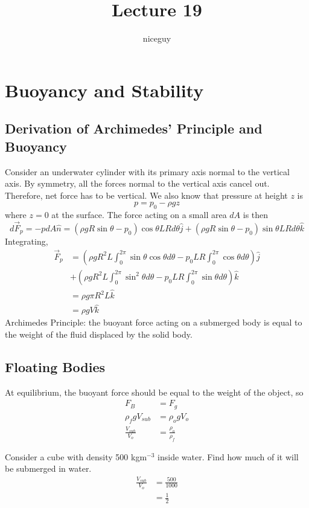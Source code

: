 \documentclass[12pt]{article}
\author{niceguy}
\title{Lecture 19}
\begin{document}
\maketitle

\section{Buoyancy and Stability}

\subsection{Derivation of Archimedes' Principle and Buoyancy}
Consider an underwater cylinder with its primary axis normal to the vertical axis. By symmetry, all the forces normal to the vertical axis cancel out. Therefore, net force has to be vertical. We also know that pressure at height $z$ is
$$p = p_0 - \rho gz$$
where $z=0$ at the surface. The force acting on a small area $dA$ is then
$$d\vec{F}_p = -pdA\hat{n} = (\rho gR\sin\theta-p_0)\cos\theta LRd\theta\hat{j} + (\rho gR\sin\theta-p_0)\sin\theta LRd\theta\hat{k}$$
Integrating,
\begin{align*}
	\vec{F}_p &= \left(\rho gR^2L\int_0^{2\pi}\sin\theta\cos\theta d\theta - p_0LR\int_0^{2\pi}\cos\theta d\theta\right)\hat{j} \\
		  &+ \left(\rho gR^2L\int_0^{2\pi}\sin^2\theta d\theta - p_0LR\int_0^{2\pi}\sin\theta d\theta\right)\hat{k} \\
		  &= \rho g\pi R^2L\hat{k} \\
		  &= \rho gV\hat{k}
\end{align*}
Archimedes Principle: the buoyant force acting on a submerged body is equal to the weight of the fluid displaced by the solid body.

\subsection{Floating Bodies}
At equilibrium, the buoyant force should be equal to the weight of the object, so
\begin{align*}
	F_B &= F_g \\
	\rho_f g V_{sub} &= \rho_o g V_o \\
	\frac{V_{sub}}{V_o} &= \frac{\rho_o}{\rho_f}
\end{align*}

\begin{ex}
	Consider a cube with density 500 kgm$^{-3}$ inside water. Find how much of it will be submerged in water.
	\begin{align*}
		\frac{V_{sub}}{V_o} &= \frac{500}{1000} \\
				    &= \frac{1}{2}
	\end{align*}
\end{ex}
\end{document}
